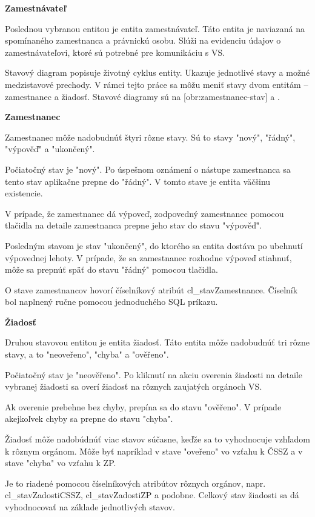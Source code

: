 \blank
\start
\setupindenting[no]
\start\bf Zamestnávateľ \stop
\stop

Poslednou vybranou entitou je entita zamestnávateľ. Táto entita je naviazaná na spomínaného zamestnanca a právnickú osobu. Slúži na evidenciu údajov o zamestnávateľovi, ktoré sú potrebné pre komunikáciu s VS.

Stavový diagram popisuje životný cyklus entity. Ukazuje jednotlivé stavy a možné medzistavové prechody. V rámci tejto práce sa môžu meniť stavy dvom entitám -- zamestnanec a žiadosť. Stavové diagramy sú na [obr:zamestnanec-stav] a .

\blank
\start
\setupindenting[no]
\start\bf Zamestnanec \stop
\stop

Zamestnanec môže nadobudnúť štyri rôzne stavy. Sú to stavy "nový", "řádný", "výpověď" a "ukončený".

Počiatočný stav je "nový". Po úspešnom oznámení o nástupe zamestnanca sa tento stav aplikačne prepne do "řádný". V tomto stave je entita väčšinu existencie. 

V prípade, že zamestnanec dá výpoveď, zodpovedný zamestnanec pomocou tlačidla na detaile zamestnanca prepne jeho stav do stavu "výpověď". 

Posledným stavom je stav "ukončený", do ktorého sa entita dostáva po ubehnutí výpovednej lehoty. V prípade, že sa zamestnanec rozhodne výpoveď stiahnuť, môže sa prepnúť späť do stavu "řádný" pomocou tlačidla. 

O stave zamestnancov hovorí číselníkový atribút cl_stavZamestnance. Číselník bol naplnený ručne pomocou jednoduchého SQL príkazu.

\blank
\start
\setupindenting[no]
\start\bf Žiadosť \stop
\stop

Druhou stavovou entitou je entita žiadosť. Táto entita môže nadobudnúť tri rôzne stavy, a to "neoveřeno", "chyba" a "ověřeno". 

Počiatočný stav je "neověřeno". Po kliknutí na akciu overenia žiadosti na detaile vybranej žiadosti sa overí žiadosť na rôznych zaujatých orgánoch VS. 

Ak overenie prebehne bez chyby, prepína sa do stavu "ověřeno". V prípade akejkoľvek chyby sa prepne do stavu "chyba". 

Žiadosť môže nadobúdnúť viac stavov súčasne, keďže sa to vyhodnocuje vzhľadom k rôznym orgánom. Môže byť napríklad v stave "oveřeno" vo vzťahu k ČSSZ a v stave "chyba" vo vzťahu k ZP. 

Je to riadené pomocou číselníkových atribútov rôznych orgánov, napr. cl_stavZadostiCSSZ, cl_stavZadostiZP a podobne. Celkový stav žiadosti sa dá vyhodnocovať na základe jednotlivých stavov. 


